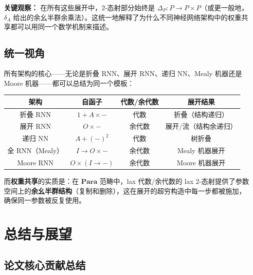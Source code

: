 \documentclass[12pt,a4paper]{ctexart}
\theoremstyle{definition}
\newcommand{\cat}[1]{\mathbf{#1}}
\newcommand{\Para}{\cat{Para}}
\begin{document}
\textbf{关键观察：} 在所有这些展开中，$2$-态射部分始终是 $\Delta_P:P\to P\times P$（或更一般地，$\delta_A$ 给出的余幺半群余乘法）。这统一地解释了为什么不同神经网络架构中的权重共享都可以用同一个数学机制来描述。

\subsection{统一视角}

所有架构的核心——无论是折叠 RNN、展开 RNN、递归 NN、Mealy 机器还是 Moore 机器——都可以总结为同一个模板：

\begin{center}
\begin{tabular}{c|c|c|c}
\toprule
\textbf{架构} & \textbf{自函子} & \textbf{代数/余代数} & \textbf{展开结果} \\
\midrule
折叠 RNN & $1+A\times-$ & 代数 & 折叠（结构递归） \\
展开 RNN & $O\times-$ & 余代数 & 展开/流（结构余递归） \\
递归 NN & $A+(-)^2$ & 代数 & 树折叠 \\
全 RNN（Mealy） & $I\to O\times-$ & 余代数 & Mealy 机器展开 \\
Moore RNN & $O\times(I\to-)$ & 余代数 & Moore 机器展开 \\
\bottomrule
\end{tabular}
\end{center}

而\textbf{权重共享}的实质是：在 $\Para$ 范畴中，lax 代数/余代数的 lax 2-态射提供了参数空间上的\textbf{余幺半群结构}（复制和删除），这在展开的超穷构造中每一步都被施加，确保同一参数被反复使用。

\newpage

\section{总结与展望}

\subsection{论文核心贡献总结}
\end{document}
